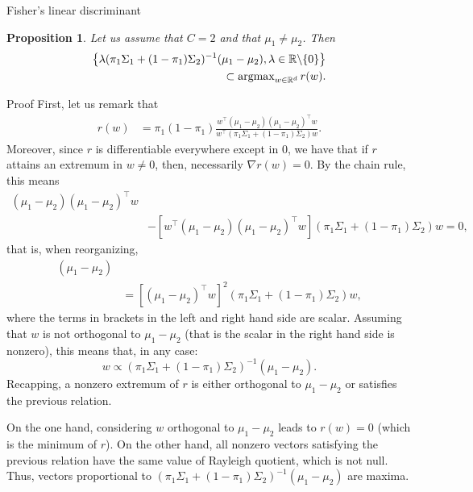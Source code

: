 \documentclass[xcolor={usenames,dvipsnames},handout]{beamer}
\newtheorem{prop}[theorem]{Proposition}
\begin{document}
\begin{frame}{Fisher's linear discriminant}

	\begin{prop}
		Let us assume that $C=2$ and that $\mu_1 \neq \mu_2$.
		Then
		\begin{align*}
			\left\{\lambda (\pi_1 \Sigma_1 + (1-\pi_1) \Sigma_2)^{-1} (\mu_1-\mu_2), \lambda \in \R\backslash\{0\} \right\} \\
			\hfill \subset
			\argmax_{w \in \R^d} r(w).
		\end{align*}
	\end{prop}
\end{frame}

\begin{frame}[allowframebreaks]{Proof}
		First, let us remark that
		\begin{align*}
			r(w)
			&= \pi_1(1-\pi_1) \frac{w^\top(\mu_1 - \mu_2)(\mu_1 - \mu_2)^\top w}{w ^\top  \left( \pi_1 \Sigma_1 + (1-\pi_1) \Sigma_2 \right) w}.
		\end{align*}
		Moreover, since $r$ is differentiable everywhere except in $0$, we have that if $r$ attains an extremum in $w\neq 0$, then, necessarily $\nabla r(w) = 0$.
		By the chain rule, this means
		\begin{align*}
			[w^\top &\left( \pi_1 \Sigma_1 + (1-\pi_1) \Sigma_2 \right) w](\mu_1 - \mu_2)(\mu_1 - \mu_2)^\top w \\			
			&- [w^\top (\mu_1 - \mu_2)(\mu_1 - \mu_2)^\top w] \left( \pi_1 \Sigma_1 + (1-\pi_1) \Sigma_2 \right) w = 0,
		\end{align*}
		that is, when reorganizing,
		\begin{align*}
			[w^\top &\left( \pi_1 \Sigma_1 + (1-\pi_1) \Sigma_2 \right) w (\mu_1 - \mu_2)^\top w](\mu_1 - \mu_2)  \\
			& = [(\mu_1 - \mu_2)^\top w]^2
			\left( \pi_1 \Sigma_1 + (1-\pi_1) \Sigma_2 \right) w,
		\end{align*}
		where the terms in brackets in the left and right hand side are scalar.
		Assuming that $w$ is not orthogonal to $\mu_1-\mu_2$ (that is the scalar in the right hand side is nonzero), this means that, in any case:
		$$
			w \propto \left( \pi_1 \Sigma_1 + (1-\pi_1) \Sigma_2 \right)^{-1}(\mu_1 - \mu_2).
		$$
		Recapping, a nonzero extremum of $r$ is either orthogonal to $\mu_1-\mu_2$ or satisfies the previous relation.

		On the one hand, considering $w$ orthogonal to $\mu_1-\mu_2$ leads to $r(w) = 0$ (which is the minimum of $r$).
		On the other hand, all nonzero vectors satisfying the previous relation have the same value of Rayleigh quotient, which is not null.
		Thus, vectors proportional to $\left( \pi_1 \Sigma_1 + (1-\pi_1) \Sigma_2 \right)^{-1}(\mu_1 - \mu_2)$ are maxima.
\end{frame}
\end{document}
